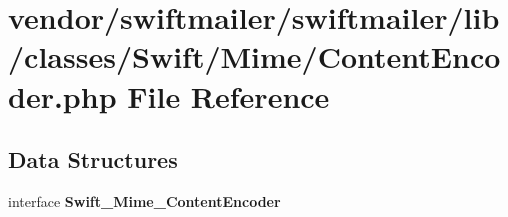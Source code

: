 \section{vendor/swiftmailer/swiftmailer/lib/classes/\+Swift/\+Mime/\+Content\+Encoder.php File Reference}
\label{_content_encoder_8php}
\subsection*{Data Structures}
\begin{DoxyCompactItemize}
\item 
interface {\bf Swift\+\_\+\+Mime\+\_\+\+Content\+Encoder}
\end{DoxyCompactItemize}
